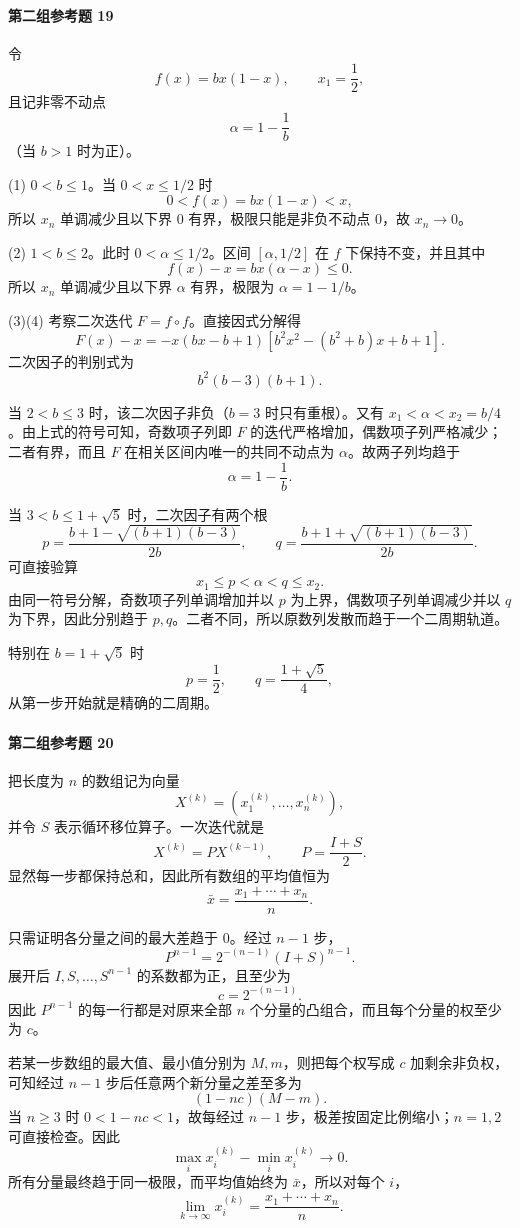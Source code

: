 \paragraph{第二组参考题 19}
\begin{xsolution}
令
\[
  f(x)=bx(1-x),\qquad x_1=\frac12,
\]
且记非零不动点
\[
  \alpha=1-\frac1b
\]
（当 $b>1$ 时为正）。

(1) $0<b\le1$。当 $0<x\le1/2$ 时
\[
  0<f(x)=bx(1-x)<x,
\]
所以 $x_n$ 单调减少且以下界 $0$ 有界，极限只能是非负不动点 $0$，故 $x_n\to0$。

(2) $1<b\le2$。此时 $0<\alpha\le1/2$。区间 $[\alpha,1/2]$ 在 $f$ 下保持不变，并且其中
\[
  f(x)-x=bx(\alpha-x)\le0.
\]
所以 $x_n$ 单调减少且以下界 $\alpha$ 有界，极限为 $\alpha=1-1/b$。

(3)(4) 考察二次迭代 $F=f\circ f$。直接因式分解得
\[
  F(x)-x
  =-x(bx-b+1)
  \left[b^2x^2-(b^2+b)x+b+1\right].
\]
二次因子的判别式为
\[
  b^2(b-3)(b+1).
\]

当 $2<b\le3$ 时，该二次因子非负（$b=3$ 时只有重根）。又有 $x_1<\alpha<x_2=b/4$。由上式的符号可知，奇数项子列即 $F$ 的迭代严格增加，偶数项子列严格减少；二者有界，而且 $F$ 在相关区间内唯一的共同不动点为 $\alpha$。故两子列均趋于
\[
  \boxed{\alpha=1-\frac1b}.
\]

当 $3<b\le1+\sqrt5$ 时，二次因子有两个根
\[
  p=\frac{b+1-\sqrt{(b+1)(b-3)}}{2b},
  \qquad
  q=\frac{b+1+\sqrt{(b+1)(b-3)}}{2b}.
\]
可直接验算
\[
  x_1\le p<\alpha<q\le x_2.
\]
由同一符号分解，奇数项子列单调增加并以 $p$ 为上界，偶数项子列单调减少并以 $q$ 为下界，因此分别趋于 $p,q$。二者不同，所以原数列发散而趋于一个二周期轨道。

特别在 $b=1+\sqrt5$ 时
\[
  p=\frac12,
  \qquad
  q=\frac{1+\sqrt5}{4},
\]
从第一步开始就是精确的二周期。
\end{xsolution}

\paragraph{第二组参考题 20}
\begin{xsolution}
把长度为 $n$ 的数组记为向量
\[
  X^{(k)}=(x_1^{(k)},\ldots,x_n^{(k)}),
\]
并令 $S$ 表示循环移位算子。一次迭代就是
\[
  X^{(k)}=PX^{(k-1)},
  \qquad
  P=\frac{I+S}{2}.
\]
显然每一步都保持总和，因此所有数组的平均值恒为
\[
  \bar x=\frac{x_1+\cdots+x_n}{n}.
\]

只需证明各分量之间的最大差趋于 $0$。经过 $n-1$ 步，
\[
  P^{n-1}=2^{-(n-1)}(I+S)^{n-1}.
\]
展开后 $I,S,\ldots,S^{n-1}$ 的系数都为正，且至少为
\[
  c=2^{-(n-1)}.
\]
因此 $P^{n-1}$ 的每一行都是对原来全部 $n$ 个分量的凸组合，而且每个分量的权至少为 $c$。

若某一步数组的最大值、最小值分别为 $M,m$，则把每个权写成 $c$ 加剩余非负权，可知经过 $n-1$ 步后任意两个新分量之差至多为
\[
  (1-nc)(M-m).
\]
当 $n\ge3$ 时 $0<1-nc<1$，故每经过 $n-1$ 步，极差按固定比例缩小；$n=1,2$ 可直接检查。因此
\[
  \max_i x_i^{(k)}-\min_i x_i^{(k)}\to0.
\]
所有分量最终趋于同一极限，而平均值始终为 $\bar x$，所以对每个 $i$，
\[
  \boxed{\lim_{k\to\infty}x_i^{(k)}
  =\frac{x_1+\cdots+x_n}{n}}.
\]
\end{xsolution}

